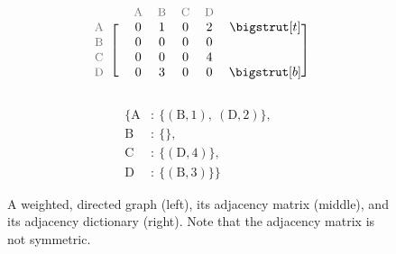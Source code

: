\begin{figure}[H] %
\captionsetup[subfigure]{justification=centering}
\centering
\begin{subfigure}{.32\textwidth}
\centering
{}
\end{subfigure}
%
\begin{subfigure}{.32\textwidth}
\centering
\begin{align*}
    \begin{blockarray}{ccccccc}
    & & \small\text{\textcolor{gray}{A}} & \small\text{\textcolor{gray}{B}} & \small\text{\textcolor{gray}{C}} & \small\text{\textcolor{gray}{D}} & \\
    \begin{block}{c[cccccc]}
    \small\text{\textcolor{gray}{A}} & & 0 & 1 & 0 & 2 & \topstrut\\
    \small\text{\textcolor{gray}{B}} & & 0 & 0 & 0 & 0 & \\
    \small\text{\textcolor{gray}{C}} & & 0 & 0 & 0 & 4 & \\
    \small\text{\textcolor{gray}{D}} & & 0 & 3 & 0 & 0 & \botstrut\\
    \end{block}\end{blockarray}
\end{align*}
\end{subfigure}
%
\begin{subfigure}{.32\textwidth}
\centering
\begin{align*}
    \{\text{A}&:\ \{(\text{B}, 1),\ (\text{D}, 2)\},\\
    \text{B}&:\ \{\},\\
    \text{C}&:\ \{(\text{D}, 4)\},\\
    \text{D}&:\ \{(\text{B}, 3)\}\}
\end{align*}
\end{subfigure}
\caption{A weighted, directed graph (left), its adjacency matrix (middle), and its adjacency dictionary (right).
Note that the adjacency matrix is not symmetric.}
\end{figure}


